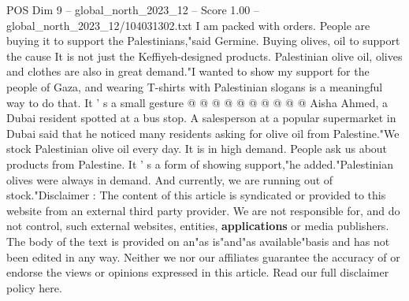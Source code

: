 \begin{textsample}{POS Dim 9 – global\_north\_2023\_12 – Score 1.00 – global\_north\_2023\_12/104031302.txt}
I am packed with orders.
People are buying it to support the Palestinians,"said Germine.
Buying olives, oil to support the cause It is not just the Keffiyeh-designed products.
Palestinian olive oil, olives and clothes are also in great demand."I wanted to show my support for the people of Gaza, and wearing T-shirts with Palestinian slogans is a meaningful way to do that.
It ' s a small gesture @ @ @ @ @ @ @ @ @ @ Aisha Ahmed, a Dubai resident spotted at a bus stop.
A salesperson at a popular supermarket in Dubai said that he noticed many residents asking for olive oil from Palestine."We stock Palestinian olive oil every day.
It is in high demand.
People ask us about products from Palestine.
It ' s a form of showing support,"he added."Palestinian olives were always in demand.
And currently, we are running out of stock."Disclaimer : The content of this article is syndicated or provided to this website from an external third party provider.
We are not responsible for, and do not control, such external websites, entities, \textbf{applications} or media publishers.
The body of the text is provided on an"as is"and"as available"basis and has not been edited in any way.
Neither we nor our affiliates guarantee the accuracy of or endorse the views or opinions expressed in this article.
Read our full disclaimer policy here.

\end{textsample}
